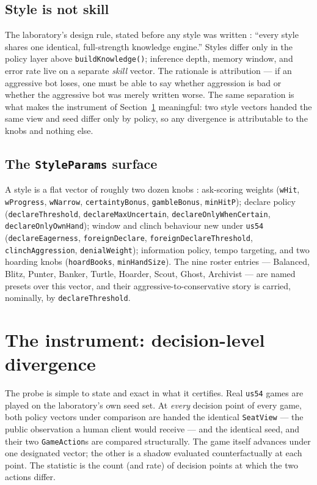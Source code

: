 \documentclass[11pt]{article}
\newcommand{\code}[1]{\texttt{#1}}
\begin{document}
\subsection{Style is not skill}

The laboratory's design rule, stated before any style was written \cite{botlab}: ``every style
shares one identical, full-strength knowledge engine.'' Styles differ only in the policy layer
above \code{buildKnowledge()}; inference depth, memory window, and error rate live on a separate
\emph{skill} vector. The rationale is attribution --- if an aggressive bot loses, one must be able
to say whether aggression is bad or whether the aggressive bot was merely written worse. The same
separation is what makes the instrument of Section~\ref{sec:instrument} meaningful: two style
vectors handed the same view and seed differ only by policy, so any divergence is attributable
to the knobs and nothing else.

\subsection{The \code{StyleParams} surface}

A style is a flat vector of roughly two dozen knobs \cite{styles}: ask-scoring weights
(\code{wHit}, \code{wProgress}, \code{wNarrow}, \code{certaintyBonus}, \code{gambleBonus},
\code{minHitP}); declare policy (\code{declareThreshold}, \code{declareMaxUncertain},
\code{declareOnlyWhenCertain}, \code{declareOnlyOwnHand}); window and clinch behaviour new under
\code{us54} (\code{declareEagerness}, \code{foreignDeclare}, \code{foreignDeclareThreshold},
\code{clinchAggression}, \code{denialWeight}); information policy, tempo targeting, and two
hoarding knobs (\code{hoardBooks}, \code{minHandSize}). The nine roster entries --- Balanced,
Blitz, Punter, Banker, Turtle, Hoarder, Scout, Ghost, Archivist --- are named presets over this
vector, and their aggressive-to-conservative story is carried, nominally, by
\code{declareThreshold}.

\section{The instrument: decision-level divergence}
\label{sec:instrument}

The probe is simple to state and exact in what it certifies. Real \code{us54} games are played
on the laboratory's own seed set. At \emph{every} decision point of every game, both policy
vectors under comparison are handed the identical \code{SeatView} --- the public observation a
human client would receive --- and the identical seed, and their two \code{GameAction}s are
compared structurally. The game itself advances under one designated vector; the other is a
shadow evaluated counterfactually at each point. The statistic is the count (and rate) of
decision points at which the two actions differ.
\end{document}
